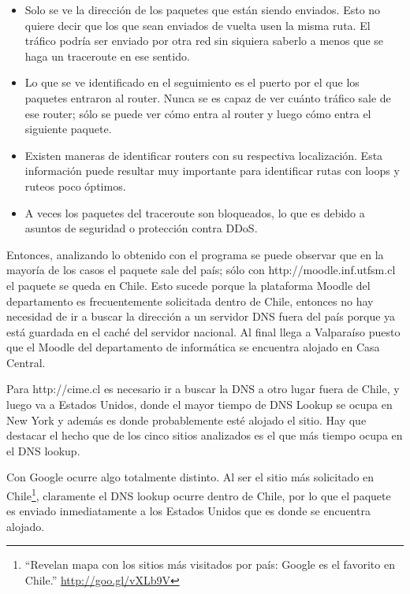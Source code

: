 \documentclass{article}
\begin{document}
\begin{itemize}
\item Solo se ve la dirección de los paquetes que están siendo enviados. Esto no quiere decir que los que sean enviados de vuelta usen la misma ruta. El tráfico podría ser enviado por otra red sin siquiera saberlo a menos que se haga un traceroute en ese sentido.

\item Lo que se ve identificado en el seguimiento es el puerto por el que los paquetes entraron al router. Nunca se es capaz de ver cuánto tráfico sale de ese router; sólo se puede ver cómo entra al router y luego cómo entra el siguiente paquete.

\item Existen maneras de identificar routers con su respectiva localización. Esta información puede resultar muy importante para identificar rutas con loops y ruteos poco óptimos.

\item A veces los paquetes del traceroute son bloqueados, lo que es debido a asuntos de seguridad o protección contra DDoS.

\end{itemize}

Entonces, analizando lo obtenido con el programa se puede observar que en la mayoría de los casos el paquete sale del país; sólo con http://moodle.inf.utfsm.cl el paquete se queda en Chile. Esto sucede porque la plataforma Moodle del departamento es frecuentemente solicitada dentro de Chile, entonces no hay necesidad de ir a buscar la dirección a un servidor DNS fuera del país porque ya está guardada en el caché del servidor nacional. Al final llega a Valparaíso puesto que el Moodle del departamento de informática se encuentra alojado en Casa Central. 

Para http://cime.cl es necesario ir a buscar la DNS a otro lugar fuera de Chile, y luego va a Estados Unidos, donde el mayor tiempo de DNS Lookup se ocupa en New York y además es donde probablemente esté alojado el sitio. Hay que destacar el hecho que de los cinco sitios analizados es el que más tiempo ocupa en el DNS lookup.

Con Google ocurre algo totalmente distinto. Al ser el sitio más solicitado en Chile\footnote{``Revelan mapa con los sitios más visitados por país: Google es el favorito en Chile.'' \url{http://goo.gl/vXLb9V}}, claramente el DNS lookup ocurre dentro de Chile, por lo que el paquete es enviado inmediatamente a los Estados Unidos que es donde se encuentra alojado. 
\end{document}
